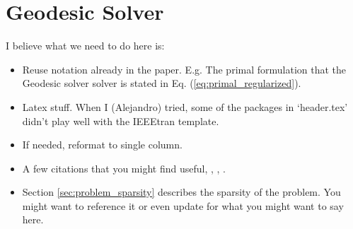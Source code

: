 \section{Geodesic Solver}
\label{sec:geodesic_solver}


I believe what we need to do here is:
\begin{itemize}
    \item Reuse notation already in the paper. E.g. The primal formulation that
    the Geodesic solver solver is stated in Eq. (\ref{eq:primal_regularized}). 
    \item Latex stuff. When I (Alejandro) tried, some of the packages in
    `header.tex' didn't play well with the IEEEtran template.
    \item If needed, reformat to single column. 
    \item A few citations that you might find useful, \cite[\S
    9]{bib:davis2016survey}, \cite{bib:smail2017junction},
    \cite{bib:permenter2020}.
    \item Section \ref{sec:problem_sparsity} describes the sparsity of the
    problem. You might want to reference it or even update for what you might
    want to say here.
\end{itemize}
